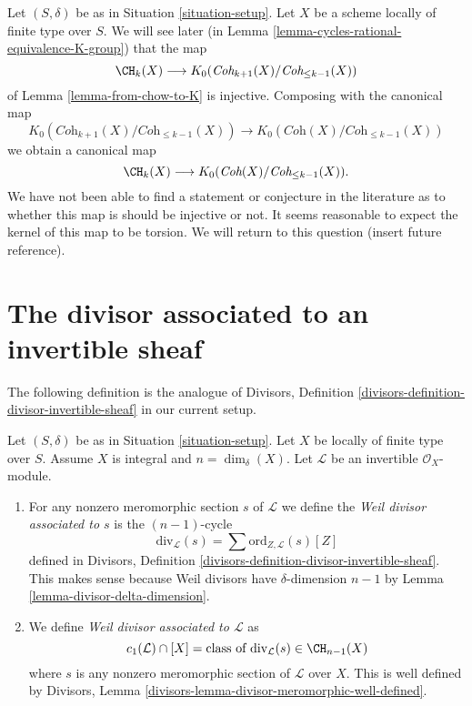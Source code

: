 \begin{remark}
\label{remark-good-cases-K-A}
Let $(S, \delta)$ be as in Situation \ref{situation-setup}.
Let $X$ be a scheme locally of finite type over $S$.
We will see later (in Lemma \ref{lemma-cycles-rational-equivalence-K-group})
that the map
$$
\CH_k(X)
\longrightarrow
K_0(\textit{Coh}_{k + 1}(X)/\textit{Coh}_{\leq k - 1}(X))
$$
of Lemma \ref{lemma-from-chow-to-K} is injective.
Composing with the canonical map
$$
K_0(\textit{Coh}_{k + 1}(X)/\textit{Coh}_{\leq k - 1}(X))
\longrightarrow
K_0(\textit{Coh}(X)/\textit{Coh}_{\leq k - 1}(X))
$$
we obtain a canonical map
$$
\CH_k(X)
\longrightarrow
K_0(\textit{Coh}(X)/\textit{Coh}_{\leq k - 1}(X)).
$$
We have not been able to find a statement or conjecture in the
literature as to whether this map is should be injective or not.
It seems reasonable to expect the kernel of this map to be torsion.
We will return to this question (insert future reference).
\end{remark}















\section{The divisor associated to an invertible sheaf}
\label{section-divisor-invertible-sheaf}

\noindent
The following definition is the analogue of
Divisors, Definition \ref{divisors-definition-divisor-invertible-sheaf}
in our current setup.

\begin{definition}
\label{definition-divisor-invertible-sheaf}
Let $(S, \delta)$ be as in Situation \ref{situation-setup}.
Let $X$ be locally of finite type over $S$. Assume $X$ is
integral and $n = \dim_\delta(X)$.
Let $\mathcal{L}$ be an invertible $\mathcal{O}_X$-module.
\begin{enumerate}
\item For any nonzero meromorphic section $s$ of $\mathcal{L}$
we define the {\it Weil divisor associated to $s$} is the
$(n - 1)$-cycle
$$
\text{div}_\mathcal{L}(s) =
\sum \text{ord}_{Z, \mathcal{L}}(s) [Z]
$$
defined in Divisors, Definition
\ref{divisors-definition-divisor-invertible-sheaf}.
This makes sense because Weil divisors have $\delta$-dimension $n - 1$
by Lemma \ref{lemma-divisor-delta-dimension}.
\item We define {\it Weil divisor associated to $\mathcal{L}$} as
$$
c_1(\mathcal{L}) \cap [X] =
\text{class of }\text{div}_\mathcal{L}(s) \in \CH_{n - 1}(X)
$$
where $s$ is any nonzero meromorphic section of $\mathcal{L}$ over
$X$. This is well defined by
Divisors, Lemma \ref{divisors-lemma-divisor-meromorphic-well-defined}.
\end{enumerate}
\end{definition}


